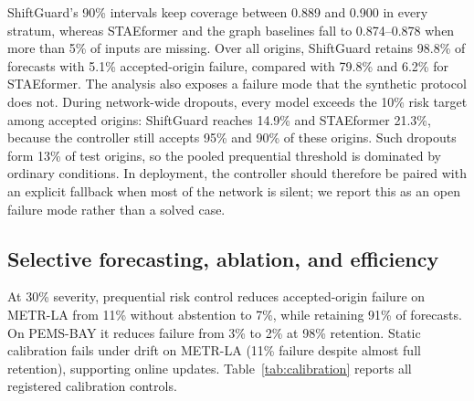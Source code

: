 \documentclass[preprint,12pt]{elsarticle}
\begin{document}
ShiftGuard's 90\% intervals keep coverage between 0.889 and 0.900 in every
stratum, whereas STAEformer and the graph baselines fall to 0.874--0.878 when
more than 5\% of inputs are missing. Over all origins, ShiftGuard retains
98.8\% of forecasts with 5.1\% accepted-origin failure, compared with 79.8\% and
6.2\% for STAEformer. The analysis also exposes a failure mode that the synthetic
protocol does not. During network-wide dropouts, every model exceeds the 10\%
risk target among accepted origins: ShiftGuard reaches 14.9\% and STAEformer
21.3\%, because the controller still accepts 95\% and 90\% of these origins.
Such dropouts form 13\% of test origins, so the pooled prequential threshold is
dominated by ordinary conditions. In deployment, the controller should
therefore be paired with an explicit fallback when most of the network is
silent; we report this as an open failure mode rather than a solved case.
\begin{table}[t]
  \centering
  \caption{METR-LA test origins grouped by their own input missingness, with
  no synthetic outage applied; mean over five seeds. Dead-sensor MAE is
  computed on cells whose sensor was missing for the whole input window but
  whose target was observed. Failure rate is the share of accepted origins
  with mean absolute error above 5 mph.}
  \label{tab:natural-missingness}
  \resizebox{\columnwidth}{!}{}
\end{table}

\subsection{Selective forecasting, ablation, and efficiency}
At 30\% severity, prequential risk control reduces accepted-origin failure on
METR-LA from 11\% without abstention to 7\%, while retaining 91\% of forecasts.
On PEMS-BAY it reduces failure from 3\% to 2\% at 98\% retention. Static
calibration fails under drift on METR-LA (11\% failure despite almost full
retention), supporting online updates. Table~\ref{tab:calibration} reports all registered
calibration controls.
\begin{table}[t]
  \centering
  \caption{Calibration and selection controls at 30\% outage severity,
  averaged over non-clean families and five seeds.}
  \label{tab:calibration}
  \resizebox{\columnwidth}{!}{}
\end{table}
\end{document}
